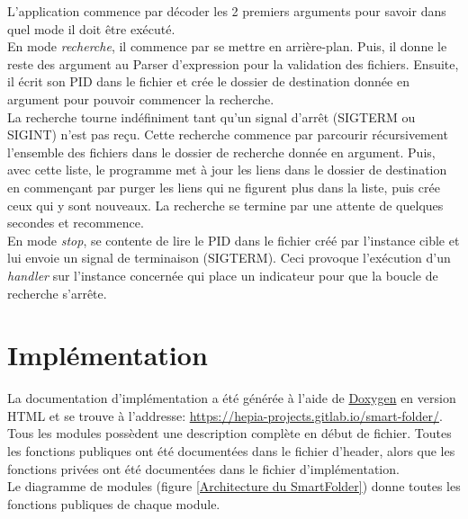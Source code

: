\documentclass[11pt, a4paper]{article}
\begin{document}
L'application commence par décoder les 2 premiers arguments pour savoir dans quel mode il doit être exécuté. \\

En mode \textit{recherche}, il commence par se mettre en arrière-plan.
Puis, il donne le reste des argument au Parser d'expression pour la validation des fichiers.
Ensuite, il écrit son PID dans le fichier et crée le dossier de destination donnée en argument pour pouvoir commencer la recherche. \\

La recherche tourne indéfiniment tant qu'un signal d'arrêt (SIGTERM ou SIGINT) n'est pas reçu.
Cette recherche commence par parcourir récursivement l'ensemble des fichiers dans le dossier de recherche donnée en argument.
Puis, avec cette liste, le programme met à jour les liens dans le dossier de destination en commençant par purger
les liens qui ne figurent plus dans la liste, puis crée ceux qui y sont nouveaux.
La recherche se termine par une attente de quelques secondes et recommence. \\

En mode \textit{stop}, se contente de lire le PID dans le fichier créé par l'instance cible et
lui envoie un signal de terminaison (SIGTERM).
Ceci provoque l'exécution d'un \textit{handler} sur l'instance concernée qui place un indicateur
pour que la boucle de recherche s'arrête.

\newpage

\section{Implémentation}

La documentation d'implémentation a été générée à l'aide de \href{http://www.doxygen.org/index.html}{Doxygen} en version HTML et se trouve à l'addresse:
\url{https://hepia-projects.gitlab.io/smart-folder/}. \\

Tous les modules possèdent une description complète en début de fichier.
Toutes les fonctions publiques ont été documentées dans le fichier d'header,
alors que les fonctions privées ont été documentées dans le fichier d'implémentation. \\

Le diagramme de modules (figure \ref{Architecture du SmartFolder}) donne toutes les fonctions publiques de chaque module.
\end{document}
